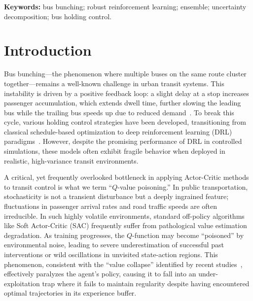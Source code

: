 \documentclass[10pt]{article}
\begin{document}
\noindent\textbf{Keywords:} bus bunching; robust reinforcement learning; ensemble; uncertainty decomposition; bus holding control.


\section{Introduction}

Bus bunching---the phenomenon where multiple buses on the same route cluster together---remains a well-known challenge in urban transit systems. This instability is driven by a positive feedback loop: a slight delay at a stop increases passenger accumulation, which extends dwell time, further slowing the leading bus while the trailing bus speeds up due to reduced demand~\cite{Daganzo2009Headway, Xuan2011Dynamic}. To break this cycle, various holding control strategies have been developed, transitioning from classical schedule-based optimization to deep reinforcement learning (DRL) paradigms~\cite{Wang2020DynamicHolding}.
However, despite the promising performance of DRL in controlled simulations, these models often exhibit fragile behavior when deployed in realistic, high-variance transit environments.

A critical, yet frequently overlooked bottleneck in applying Actor-Critic methods to transit control is what we term ``$Q$-value poisoning.'' In public transportation, stochasticity is not a transient disturbance but a deeply ingrained feature; fluctuations in passenger arrival rates and road traffic speeds are often irreducible. In such highly volatile environments, standard off-policy algorithms like Soft Actor-Critic (SAC) frequently suffer from pathological value estimation degradation. As training progresses, the $Q$-function may become ``poisoned'' by environmental noise, leading to severe underestimation of successful past interventions or wild oscillations in unvisited state-action regions. This phenomenon, consistent with the ``value collapse'' identified by recent studies~\cite{Ji2024SeizingSerendipity}, effectively paralyzes the agent's policy, causing it to fall into an under-exploitation trap where it fails to maintain regularity despite having encountered optimal trajectories in its experience buffer.
\end{document}
